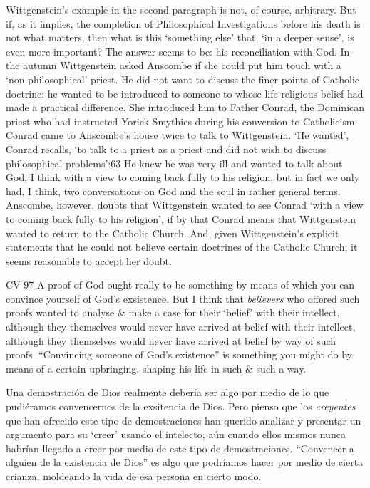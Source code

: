 Wittgenstein’s example in the second paragraph is not, of course, arbitrary. But if, as it implies, the completion of Philosophical Investigations before his death is not what matters, then what is this ‘something else’ that, ‘in a deeper sense’, is even more important? The answer seems to be: his reconciliation with God. In the autumn Wittgenstein asked Anscombe if she could put him touch with a ‘non-philosophical’ priest. He did not want to discuss the finer points of Catholic doctrine; he wanted to be introduced to someone to whose life religious belief had made a practical difference. She introduced him to Father Conrad, the Dominican priest who had instructed Yorick Smythies during his conversion to Catholicism. Conrad came to Anscombe’s house twice to talk to Wittgenstein. ‘He wanted’, Conrad recalls, ‘to talk to a priest as a priest and did not wish to discuss philosophical problems’:63 He knew he was very ill and wanted to talk about God, I think with a view to coming back fully to his religion, but in fact we only had, I think, two conversations on God and the soul in rather general terms. Anscombe, however, doubts that Wittgenstein wanted to see Conrad ‘with a view to coming back fully to his religion’, if by that Conrad means that Wittgenstein wanted to return to the Catholic Church. And, given Wittgenstein’s explicit statements that he could not believe certain doctrines of the Catholic Church, it seems reasonable to accept her doubt.



CV 97
A proof of God ought really to be something by means of which you can convince yourself of God's exsistence. But I think that \emph{believers} who offered such proofs wanted to analyse \& make a case for their `belief' with their intellect, although they themselves would never have arrived at belief with their intellect, although they themselves would never have arrived at belief by way of such proofs. ``Convincing someone of God's existence'' is something you might do by means of a certain upbringing, shaping his life in such \& such a way.

Una demostración de Dios realmente debería ser algo por medio de lo que pudiéramos convencernos de la exsitencia de Dios. Pero pienso que los \emph{creyentes} que han ofrecido este tipo de demostraciones han querido analizar y presentar un argumento para su `creer' usando el intelecto, aún cuando ellos mismos nunca habrían llegado a creer por medio de este tipo de demostraciones. ``Convencer a alguien de la existencia de Dios'' es algo que podríamos hacer por medio de cierta crianza, moldeando la vida de esa persona en cierto modo.


